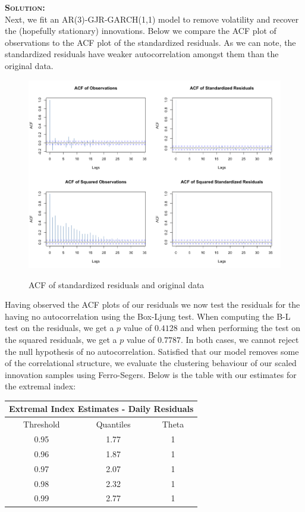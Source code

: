 \documentclass[12pt,oneside]{article}
\newenvironment{solution}
    {\textbf{\textsc{Solution:}}\\}
    {\newpage}
\begin{document}
\begin{solution}
Next, we fit an AR(3)-GJR-GARCH(1,1) model to remove volatility and recover the (hopefully stationary) innovations. Below we compare the ACF plot of observations to the ACF plot of the standardized residuals. As we can note, the standardized residuals have weaker autocorrelation amongst them than the original data. 
\begin{figure}[H]
\begin{center}
{\includegraphics[width=4.5in]{Assignments/a4/day-acfs.png}}
\caption{ACF of standardized residuals and original data}
\end{center}
\end{figure}

Having observed the ACF plots of our residuals we now test the residuals for the having no autocorrelation using the Box-Ljung test. When computing the B-L test on the residuals, we get a $p$ value of $0.4128$ and when performing the test on the squared residuals, we get a $p$ value of $0.7787$. In both cases, we cannot reject the null hypothesis of no autocorrelation. Satisfied that our model removes some of the correlational structure, we evaluate the clustering behaviour of our scaled innovation samples  using Ferro-Segers. Below is the table with our estimates for the extremal index:
\begin{center}
\begin{tabular}{ ||c |c |c|| }\hline
\multicolumn{3}{||c||}{Extremal Index Estimates - Daily Residuals}\\\hline\hline
Threshold & Quantiles& Theta\\\hline
 0.95 & 1.77 & 1 \\ \hline
 0.96 & 1.87 & 1 \\  \hline
 0.97 & 2.07 & 1  \\\hline  
 0.98 & 2.32 & 1 \\ \hline
 0.99 & 2.77 & 1 \\  \hline
\end{tabular}
\end{center}



\end{solution}
\end{document}
